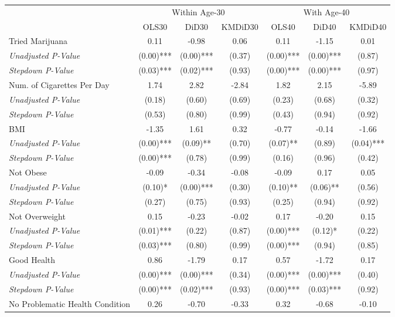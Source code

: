 \begin{tabular}{l c c c c c c}
\toprule
& \multicolumn{3}{c}{Within Age-30} & \multicolumn{3}{c}{With Age-40} \\\cmidrule(lr){2-4} \cmidrule(lr){5-7}
 & OLS30 & DiD30 & KMDiD30 & OLS40 & DiD40 & KMDiD40 \\
\midrule
Tried Marijuana & 0.11 & -0.98 & 0.06 & 0.11 & -1.15 & 0.01 \\
\quad \textit{Unadjusted P-Value} & (0.00)*** & (0.00)*** & (0.37) & (0.00)*** & (0.00)*** & (0.87) \\
\quad \textit{Stepdown P-Value} & (0.03)*** & (0.02)*** & (0.93) & (0.00)*** & (0.00)*** & (0.97) \\
Num. of Cigarettes Per Day & 1.74 & 2.82 & -2.84 & 1.82 & 2.15 & -5.89 \\
\quad \textit{Unadjusted P-Value} & (0.18) & (0.60) & (0.69) & (0.23) & (0.68) & (0.32) \\
\quad \textit{Stepdown P-Value} & (0.53) & (0.80) & (0.99) & (0.43) & (0.94) & (0.92) \\
BMI & -1.35 & 1.61 & 0.32 & -0.77 & -0.14 & -1.66 \\
\quad \textit{Unadjusted P-Value} & (0.00)*** & (0.09)** & (0.70) & (0.07)** & (0.89) & (0.04)*** \\
\quad \textit{Stepdown P-Value} & (0.00)*** & (0.78) & (0.99) & (0.16) & (0.96) & (0.42) \\
Not Obese & -0.09 & -0.34 & -0.08 & -0.09 & 0.17 & 0.05 \\
\quad \textit{Unadjusted P-Value} & (0.10)* & (0.00)*** & (0.30) & (0.10)** & (0.06)** & (0.56) \\
\quad \textit{Stepdown P-Value} & (0.27) & (0.75) & (0.93) & (0.25) & (0.94) & (0.92) \\
Not Overweight & 0.15 & -0.23 & -0.02 & 0.17 & -0.20 & 0.15 \\
\quad \textit{Unadjusted P-Value} & (0.01)*** & (0.22) & (0.87) & (0.00)*** & (0.12)* & (0.22) \\
\quad \textit{Stepdown P-Value} & (0.03)*** & (0.80) & (0.99) & (0.00)*** & (0.94) & (0.85) \\
Good Health & 0.86 & -1.79 & 0.17 & 0.57 & -1.72 & 0.17 \\
\quad \textit{Unadjusted P-Value} & (0.00)*** & (0.00)*** & (0.34) & (0.00)*** & (0.00)*** & (0.40) \\
\quad \textit{Stepdown P-Value} & (0.00)*** & (0.02)*** & (0.93) & (0.00)*** & (0.03)*** & (0.92) \\
No Problematic Health Condition & 0.26 & -0.70 & -0.33 & 0.32 & -0.68 & -0.10 \\

\end{tabular}
